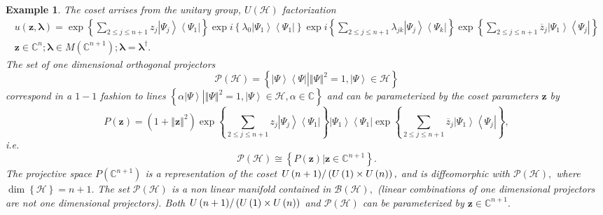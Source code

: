 \documentclass[aps,preprint]{revtex4}%
\newtheorem{example}[theorem]{Example}
\begin{document}
\begin{example}
The coset arrises from the unitary group, $U\left(  \mathcal{H}\right)  $
factorization
\begin{gather}
u\left(  \mathbf{z,}\boldsymbol{\lambda}\right)  =\exp\left\{  \sum_{2\leq
j\leq n+1}z_{j}\left\vert \Psi_{j}\right\rangle \left\langle \Psi
_{1}\right\vert \right\}  \exp i\left\{  \lambda_{0}\left\vert \Psi
_{1}\right\rangle \left\langle \Psi_{1}\right\vert \right\}  \exp i\left\{
\sum_{2\leq j\leq n+1}\lambda_{jk}\left\vert \Psi_{j}\right\rangle
\left\langle \Psi_{k}\right\vert \right\}  \exp\left\{  \sum_{2\leq j\leq
n+1}\overline{z}_{j}\left\vert \Psi_{1}\right\rangle \left\langle \Psi
_{j}\right\vert \right\} \\
\mathbf{z\in}\mathbb{C}^{n};\boldsymbol{\lambda}\in M\left(  \mathbb{C}%
^{n+1}\right)  ;\boldsymbol{\lambda}=\boldsymbol{\lambda}^{\dagger}.
\end{gather}
The set of one dimensional orthogonal projectors
\begin{equation}
\mathcal{P}\left(  \mathcal{H}\right)  =\left\{  \left.  \overset{}{\left\vert
\Psi\right\rangle \left\langle \Psi\right\vert }\right\vert \left\Vert
\Psi\right\Vert ^{2}=1,\left\vert \Psi\right\rangle \in\mathcal{H}\right\}
\end{equation}
correspond in a $1-1$ fashion to lines $\left\{  \left.  \overset{}{\alpha
\left\vert \Psi\right\rangle }\right\vert \left\Vert \Psi\right\Vert
^{2}=1,\left\vert \Psi\right\rangle \in\mathcal{H},\alpha\in\mathbb{C}%
\right\}  $ and can be parameterized by the coset parameters $\mathbf{z}$ by
\begin{equation}
P\left(  \mathbf{z}\right)  =\left(  1+\left\Vert \mathbf{z}\right\Vert
^{2}\right)  \exp\left\{  \sum_{2\leq j\leq n+1}z_{j}\left\vert \Psi
_{j}\right\rangle \left\langle \Psi_{1}\right\vert \right\}  \left\vert
\Psi_{1}\right\rangle \left\langle \Psi_{1}\right\vert \exp\left\{
\sum_{2\leq j\leq n+1}\overline{z}_{j}\left\vert \Psi_{1}\right\rangle
\left\langle \Psi_{j}\right\vert \right\}  ,
\end{equation}
i.e.
\begin{equation}
\mathcal{P}\left(  \mathcal{H}\right)  \cong\left\{  \left.  P\left(
\mathbf{z}\right)  \right\vert \mathbf{z\in}\mathbb{C}^{n+1}\right\}  .
\end{equation}
\emph{The projective space} $P\left(  \mathbb{C}^{n+1}\right)  $ \emph{is a
representation of }the coset $\left.  U\left(  n+1\right)  \right/  \left(
U\left(  1\right)  \times U\left(  n\right)  \right)  ,$ and is diffeomorphic
with $\mathcal{P}\left(  \mathcal{H}\right)  ,$ where $\dim\left\{
\mathcal{H}\right\}  =n+1.$ The set $\mathcal{P}\left(  \mathcal{H}\right)  $
is a non linear manifold contained in $\mathcal{B}\left(  \mathcal{H}\right)
,$ (linear combinations of one dimensional projectors are not one dimensional
projectors). Both $\left.  U\left(  n+1\right)  \right/  \left(  U\left(
1\right)  \times U\left(  n\right)  \right)  $ and $\mathcal{P}\left(
\mathcal{H}\right)  $ can be parameterized by $\mathbf{z\in}\mathbb{C}^{n+1}.$
\end{example}
\end{document}
